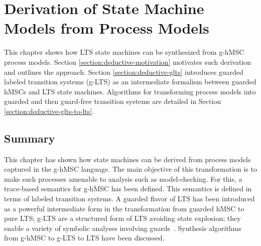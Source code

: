 \chapter{Derivation of State Machine Models from Process Models\label{chapter:deductive}}

This chapter shows how LTS state machines can be synthesized from g-hMSC process models. Section \ref{section:deductive-motivation} motivates such derivation and outlines the approach. Section \ref{section:deductive-glts} introduces guarded labeled transition systems (g-LTS) as an intermediate formalism between guarded hMSCs and LTS state machines. Algorithms for transforming process models into guarded and then guard-free transition systems are detailed in Section \ref{section:deductive-glts-to-lts}.





\section*{Summary}

This chapter has shown how state machines can be derived from process models captured in the g-hMSC language. The main objective of this transformation is to make such processes amenable to analysis such as model-checking. For this, a trace-based semantics for g-hMSC has been defined. This semantics is defined in terms of labeled transition systems. A guarded flavor of LTS has been introduced as a powerful intermediate form in the transformation from guarded hMSC to pure LTS; g-LTS are a structured form of LTS avoiding state explosion; they enable a variety of symbolic analyses involving guards~\cite{Damas:2009, Damas:2011}. Synthesis algorithms from g-hMSC to g-LTS to LTS have been discussed.
